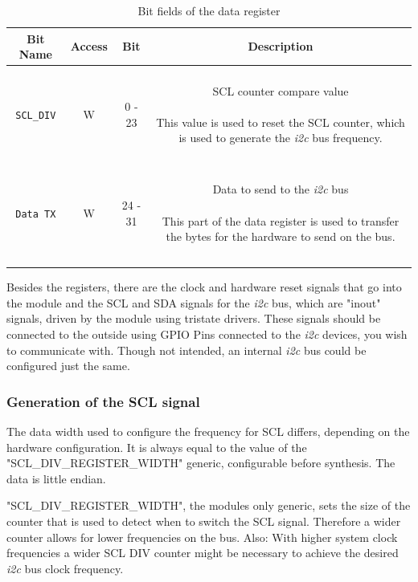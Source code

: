 \begin{longtable}[htb]{|c|c|c|c|}
\hline 
\textbf{Bit Name} & \textbf{Access} & \textbf{Bit} & \textbf{Description} \\
\hline
\endhead

\texttt{SCL\_DIV} & W & 0 - 23 &
\parbox{8,5cm}{ ~ \\ SCL counter compare value \\ ~ \\ \small
This value is used to reset the SCL counter, which is used to generate the \textit{i2c} bus frequency.
\\ ~ } \\

\hline 

\texttt{Data TX} & W & 24 - 31 &
\parbox{8,5cm}{ ~ \\ Data to send to the \textit{i2c} bus \\ ~ \\ \small
This part of the data register is used to transfer the bytes for the hardware to send on the bus.
\\ ~ } \\

\hline 

\caption{Bit fields of the data register}
\label{07-05-as-iic-data-register}
\end{longtable}

Besides the registers, there are the clock and hardware reset signals that go into the module and the SCL and SDA signals for the \textit{i2c} bus, which are "inout" signals, driven by the module using tristate drivers.
These signals should be connected to the outside using GPIO Pins connected to the \textit{i2c} devices, you wish to communicate with.
Though not intended, an internal \textit{i2c} bus could be configured just the same.

\subsubsection*{Generation of the SCL signal}

The data width used to configure the frequency for SCL differs, depending on the hardware configuration. It is always equal to the value of the "SCL\_DIV\_REGISTER\_WIDTH" generic, configurable before synthesis.
The data is little endian.

"SCL\_DIV\_REGISTER\_WIDTH", the modules only generic, sets the size of the counter that is used to detect when to switch the SCL signal. Therefore a wider counter allows for lower frequencies on the bus.
Also: With higher system clock frequencies a wider SCL DIV counter might be necessary to achieve the desired \textit{i2c} bus clock frequency.

